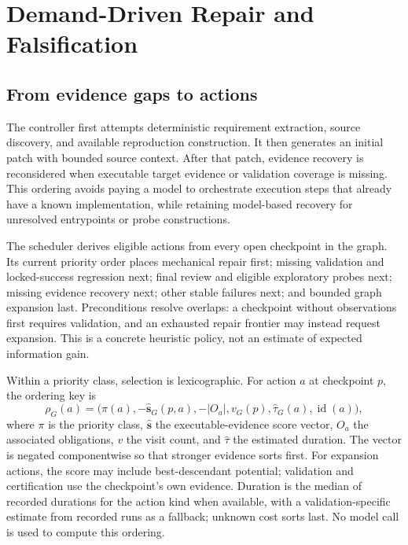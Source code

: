 \documentclass[acmsmall,screen,review,anonymous]{acmart}
\begin{document}
\section{Demand-Driven Repair and Falsification}
\subsection{From evidence gaps to actions}
The controller first attempts deterministic requirement extraction, source discovery, and available reproduction construction. It then generates an initial patch with bounded source context. After that patch, evidence recovery is reconsidered when executable target evidence or validation coverage is missing. This ordering avoids paying a model to orchestrate execution steps that already have a known implementation, while retaining model-based recovery for unresolved entrypoints or probe constructions.

The scheduler derives eligible actions from every open checkpoint in the graph. Its current priority order places mechanical repair first; missing validation and locked-success regression next; final review and eligible exploratory probes next; missing evidence recovery next; other stable failures next; and bounded graph expansion last. Preconditions resolve overlaps: a checkpoint without observations first requires validation, and an exhausted repair frontier may instead request expansion. This is a concrete heuristic policy, not an estimate of expected information gain.

Within a priority class, selection is lexicographic. For action $a$ at checkpoint $p$, the ordering key is
\begin{equation}
 \rho_G(a)=\bigl(\pi(a),-\widehat{\mathbf{s}}_G(p,a),
 -|O_a|,v_G(p),\widehat{\tau}_G(a),\operatorname{id}(a)\bigr),
 \label{eq:action-order}
\end{equation}
where $\pi$ is the priority class, $\widehat{\mathbf{s}}$ the executable-evidence score vector, $O_a$ the associated obligations, $v$ the visit count, and $\widehat{\tau}$ the estimated duration. The vector is negated componentwise so that stronger evidence sorts first. For expansion actions, the score may include best-descendant potential; validation and certification use the checkpoint's own evidence. Duration is the median of recorded durations for the action kind when available, with a validation-specific estimate from recorded runs as a fallback; unknown cost sorts last. No model call is used to compute this ordering.
\end{document}
